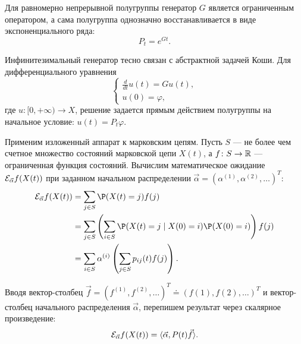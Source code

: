 \begin{statement}
    Для равномерно непрерывной полугруппы генератор $G$ является ограниченным оператором, а сама полугруппа однозначно восстанавливается в виде экспоненциального ряда:
    \[
        P_t = e^{Gt}.
    \]
\end{statement}

\begin{note}
    Инфинитезимальный генератор тесно связан с абстрактной задачей Коши. Для дифференциального уравнения 
    \[
        \begin{cases} 
            \frac{d}{dt}u(t) = G u(t), \\ 
            u(0) = \varphi,
        \end{cases}
    \]
    где $u \colon [0, +\infty) \to X$, решение задается прямым действием полугруппы на начальное условие: $u(t) = P_t \varphi$.
\end{note}

Применим изложенный аппарат к марковским цепям. Пусть $S$ — не более чем счетное множество состояний марковской цепи $X(t)$, а $f \colon S \to \mathbb{R}$ — ограниченная функция состояний. Вычислим математическое ожидание $\mathcal{E}_{\vec{\alpha}} f(X(t))$ при заданном начальном распределении $\vec{\alpha} = (\alpha^{(1)}, \alpha^{(2)}, \dots)^T$:
\begin{align*}
    \E_{\vec{\alpha}} f(X(t)) &= \sum_{j \in S} \P(X(t)=j) f(j) \\
    &= \sum_{j \in S} \left( \sum_{i \in S} \P(X(t)=j \mid X(0)=i) \P(X(0)=i) \right) f(j) \\
    &= \sum_{i \in S} \alpha^{(i)} \left( \sum_{j \in S} p_{ij}(t) f(j) \right).
\end{align*}

Вводя вектор-столбец $\vec{f} = (f^{(1)}, f^{(2)}, \dots)^T \doteq (f(1), f(2), \dots)^T$ и вектор-столбец начального распределения $\vec{\alpha}$, перепишем результат через скалярное произведение:
\[
    \mathcal{E}_{\vec{\alpha}} f(X(t)) = \langle \vec{\alpha}, P(t) \vec{f} \rangle.
\]

